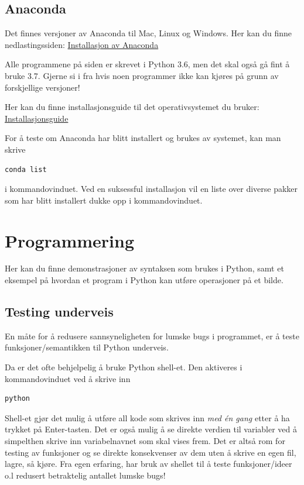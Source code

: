 \documentclass[%
oneside,                 %
final,                   %
10pt]{article}
\begin{document}
\subsection{Anaconda}
Det finnes versjoner av Anaconda til Mac, Linux og Windows. Her kan du finne nedlastingssiden: \href{{https://www.anaconda.com/download/#linux}}{Installasjon av Anaconda}

Alle programmene på siden er skrevet i Python 3.6, men det skal også gå fint å bruke 3.7.
Gjerne si i fra hvis noen programmer ikke kan kjøres på grunn av forskjellige versjoner! 

Her kan du finne installasjonsguide til det operativsystemet du bruker: \href{{https://docs.anaconda.com/anaconda/install/}}{Installasjonsguide}

For å teste om Anaconda har blitt installert og brukes av systemet, kan man skrive
\begin{verbatim}
conda list
\end{verbatim}
i kommandovinduet.
Ved en suksessful installasjon vil en liste over diverse pakker som har blitt installert dukke opp i kommandovinduet.

\section{Programmering}
Her kan du finne demonstrasjoner av syntaksen som brukes i Python, samt et eksempel på hvordan et program i Python kan utføre operasjoner på et bilde.

\subsection{Testing underveis}
En måte for å redusere sannsyneligheten for lumske bugs i programmet, er å teste funksjoner/semantikken til Python underveis.

Da er det ofte behjelpelig å bruke Python shell-et. Den aktiveres i kommandovinduet ved å skrive inn
\begin{verbatim}
python
\end{verbatim}

Shell-et gjør det mulig å utføre all kode som skrives inn \emph{med én gang} etter å ha trykket på Enter-tasten. Det er også mulig å se direkte verdien til variabler ved å simpelthen skrive inn variabelnavnet som skal vises frem.
Det er altså rom for testing av funksjoner og se direkte konsekvenser av dem uten å skrive en egen fil, lagre, så kjøre. Fra egen erfaring, har bruk av shellet til å teste funksjoner/ideer o.l redusert betraktelig antallet lumske bugs!
\end{document}
